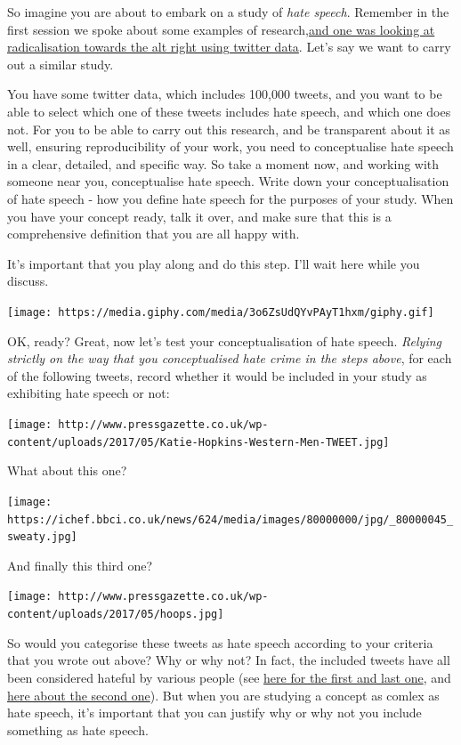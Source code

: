 \documentclass[]{book}
\theoremstyle{definition}
\theoremstyle{definition}
\theoremstyle{definition}
\theoremstyle{remark}
\begin{document}
So imagine you are about to embark on a study of \emph{hate speech}.
Remember in the first session we spoke about some examples of
research,\href{https://www.washingtonpost.com/news/the-intersect/wp/2016/09/26/these-charts-show-exactly-how-racist-and-radical-the-alt-right-has-gotten-this-year/?noredirect=on\&utm_term=.aeb311ab060c}{and
one was looking at radicalisation towards the alt right using twitter
data}. Let's say we want to carry out a similar study.

You have some twitter data, which includes 100,000 tweets, and you want
to be able to select which one of these tweets includes hate speech, and
which one does not. For you to be able to carry out this research, and
be transparent about it as well, ensuring reproducibility of your work,
you need to conceptualise hate speech in a clear, detailed, and specific
way. So take a moment now, and working with someone near you,
conceptualise hate speech. Write down your conceptualisation of hate
speech - how you define hate speech for the purposes of your study. When
you have your concept ready, talk it over, and make sure that this is a
comprehensive definition that you are all happy with.

It's important that you play along and do this step. I'll wait here
while you discuss.

\texttt{[image: https://media.giphy.com/media/3o6ZsUdQYvPAyT1hxm/giphy.gif]}

OK, ready? Great, now let's test your conceptualisation of hate speech.
\emph{Relying strictly on the way that you conceptualised hate crime in
the steps above}, for each of the following tweets, record whether it
would be included in your study as exhibiting hate speech or not:

\texttt{[image: http://www.pressgazette.co.uk/wp-content/uploads/2017/05/Katie-Hopkins-Western-Men-TWEET.jpg]}

What about this one?

\texttt{[image: https://ichef.bbci.co.uk/news/624/media/images/80000000/jpg/\_80000045\_sweaty.jpg]}

And finally this third one?

\texttt{[image: http://www.pressgazette.co.uk/wp-content/uploads/2017/05/hoops.jpg]}

So would you categorise these tweets as hate speech according to your
criteria that you wrote out above? Why or why not? In fact, the included
tweets have all been considered hateful by various people (see
\href{http://www.pressgazette.co.uk/katie-hopkins-leaving-lbc-radio-effective-immediately-station-announces/}{here
for the first and last one}, and
\href{http://www.bbc.co.uk/news/uk-scotland-glasgow-west-30641705}{here
about the second one}). But when you are studying a concept as comlex as
hate speech, it's important that you can justify why or why not you
include something as hate speech.
\end{document}
